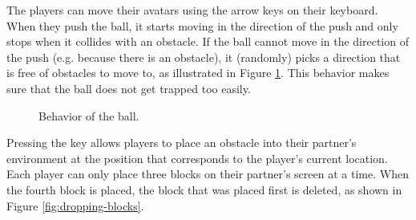 
The players can move their avatars using the arrow keys on their
keyboard. When they push the ball, it starts moving in the direction
of the push and only stops when it collides with an obstacle. If the
ball cannot move in the direction of the push (e.g. because there is
an obstacle), it (randomly) picks a direction that is free of
obstacles to move to, as illustrated in Figure
\ref{fig:pushing-against-wall}. This behavior makes sure that the ball
does not get trapped too easily.

\begin{figure}
\caption{Behavior of the ball.}
\label{fig:pushing-against-wall}
\end{figure}


Pressing the  key allows players to place an obstacle
into their partner's environment at the position that corresponds to
the player's current location. Each player can only place three blocks
on their partner's screen at a time. When the fourth block is placed,
the block that was placed first is deleted, as shown in Figure
\ref{fig:dropping-blocks}.

